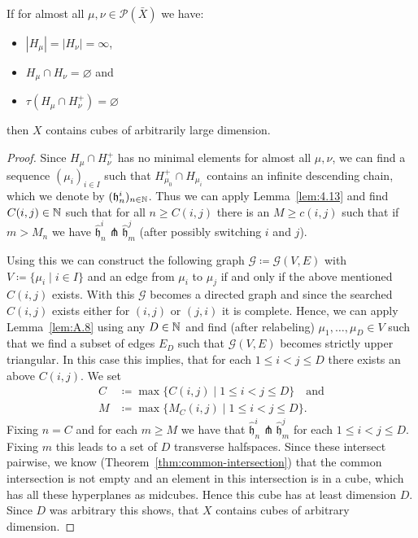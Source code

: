 \begin{prop}[{\cite[Proposition~4.10]{MR3509968}}]
  \label{prop:4.10}
  If for almost all \(\mu, \nu \in \mathcal{P}(\bar X)\) we have:
  \begin{itemize}
  \item \(|H_\mu| = |H_\nu| = \infty\),
  \item \(H_\mu \cap H_\nu = \varnothing\) and
  \item \(\tau(H_\mu \cap H_\nu^+) = \varnothing\)
  \end{itemize}
  then \(X\) contains cubes of arbitrarily large dimension.
\end{prop}

\begin{proof}
  Since \(H_\mu \cap H_\nu^+\) has no minimal elements for almost all \(\mu, \nu\), we can find a sequence \((\mu_i)_{i \in I}\) such that \(H_{\mu_0}^+ \cap H_{\mu_i}\) contains an infinite descending chain, which we denote by \((\mathfrak{h}^i_n)_{n \in \mathbb{N}}\). Thus we can apply Lemma~\ref{lem:4.13} and find \(C(i,j) \in \mathbb{N}\) such that for all \(n \geq C(i,j)\) there is an \(M \geq c(i,j)\) such that if \(m > M_n\) we have \(\mathfrak{\hat h}_n^i \pitchfork \mathfrak{\hat h}_m^j\) (after possibly switching \(i\) and \(j\)).

  Using this we can construct the following graph \(\mathcal{G} \coloneqq \mathcal{G}(V,E)\) with \(V \coloneqq \{\mu_i \mid i \in I\}\) and an edge from \(\mu_i\) to \(\mu_j\) if and only if the above mentioned \(C(i,j)\) exists. With this \(\mathcal{G}\) becomes a directed graph and since the searched \(C(i,j)\) exists either for \((i,j)\) or \((j,i)\) it is complete. Hence, we can apply Lemma~\ref{lem:A.8} using any \(D \in \mathbb{N}\) and find (after relabeling) \(\mu_1, \dots, \mu_D \in V\) such that we find a subset of edges \(E_D\) such that \(\mathcal{G}(V,E)\) becomes strictly upper triangular. In this case this implies, that for each \(1\leq i < j \leq D\) there exists an above \(C(i,j)\). We set
  \begin{align*}
    C &\coloneqq \max\{C(i,j) \mid 1 \leq i < j \leq D\} \quad \text{and}\\
    M &\coloneqq \max\{M_C(i,j) \mid 1 \leq i < j \leq D\}.
  \end{align*}
  Fixing \(n = C\) and for each \(m \geq M\) we have that \(\mathfrak{\hat h}_n^i \pitchfork \mathfrak{\hat h}_m^j\) for each \(1 \leq i < j \leq D\). Fixing \(m\) this leads to a set of \(D\) transverse halfspaces. Since these intersect pairwise, we know (Theorem~\ref{thm:common-intersection}) that the common intersection is not empty and an element in this intersection is in a cube, which has all these hyperplanes as midcubes. Hence this cube has at least dimension \(D\). Since \(D\) was arbitrary this shows, that \(X\) contains cubes of arbitrary dimension.
\end{proof}

